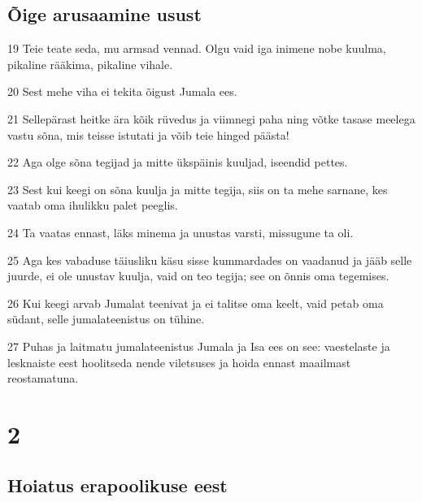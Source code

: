 \section*{Õige arusaamine usust}

\par 19 Teie teate seda, mu armsad vennad. Olgu vaid iga inimene nobe kuulma, pikaline rääkima, pikaline vihale.
\par 20 Sest mehe viha ei tekita õigust Jumala ees.
\par 21 Sellepärast heitke ära kõik rüvedus ja viimnegi paha ning võtke tasase meelega vastu sõna, mis teisse istutati ja võib teie hinged päästa!
\par 22 Aga olge sõna tegijad ja mitte ükspäinis kuuljad, iseendid pettes.
\par 23 Sest kui keegi on sõna kuulja ja mitte tegija, siis on ta mehe sarnane, kes vaatab oma ihulikku palet peeglis.
\par 24 Ta vaatas ennast, läks minema ja unustas varsti, missugune ta oli.
\par 25 Aga kes vabaduse täiusliku käsu sisse kummardades on vaadanud ja jääb selle juurde, ei ole unustav kuulja, vaid on teo tegija; see on õnnis oma tegemises.
\par 26 Kui keegi arvab Jumalat teenivat ja ei talitse oma keelt, vaid petab oma südant, selle jumalateenistus on tühine.
\par 27 Puhas ja laitmatu jumalateenistus Jumala ja Isa ees on see: vaestelaste ja lesknaiste eest hoolitseda nende viletsuses ja hoida ennast maailmast reostamatuna.



\chapter{2}

\section*{Hoiatus erapoolikuse eest}

